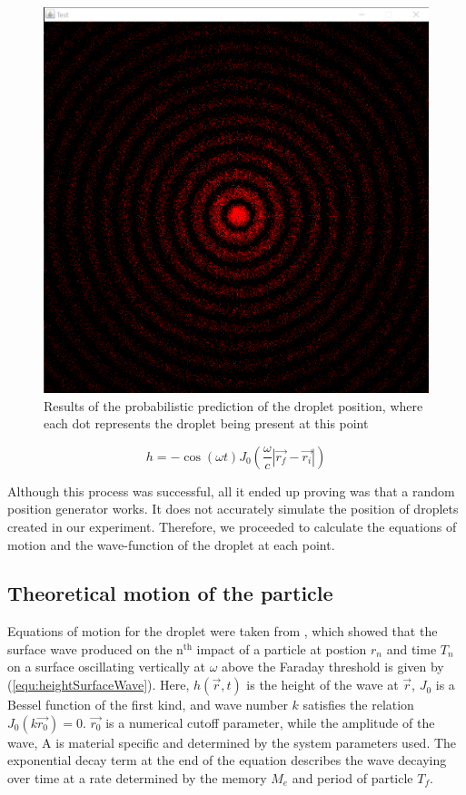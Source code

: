 \begin{figure}
\centering
\includegraphics[width=\textwidth]{simulation/probabiltyPosition.png}
\caption{Results of the probabilistic prediction of the droplet position, where each dot represents the droplet being present at this point}
\label{fig:probabilisticPrediction}
\end{figure}

\begin{equation}
    h = -\cos(\omega t) J_0(\frac{\omega}{c} |\vec{r_f}-\vec{r_i}|)
    \label{equ:probWaveEqn}
\end{equation}

Although this process was successful, all it ended up proving was that a random position generator works. It does not accurately simulate the position of droplets created in our experiment. Therefore, we proceeded to calculate the equations of motion and the wave-function of the droplet at each point.

\subsection{Theoretical motion of the particle}

Equations of motion for the droplet were taken from \cite{oza2013trajectory}, which showed that the surface wave produced on the $\textrm{n}^{\textrm{th}}$ impact of a particle at postion $r_n$ and time $T_n$ on a surface oscillating vertically at $\omega$ above the Faraday threshold is given by (\ref{equ:heightSurfaceWave}). Here, $ h(\vec{r} , t)$ is the height of the wave at $\vec{r}$, $J_0$ is a Bessel function of the first kind, and wave number $k$ satisfies the relation $ J_0 \left( k \vec{r_0} \right) = 0$. $\vec{r_0}$ is a numerical cutoff parameter, while the amplitude of the wave, A is material specific and determined by the system parameters used. The exponential decay term at the end of the equation describes the wave decaying over time at a rate determined by the memory $M_e$ and period of particle $T_f$.

